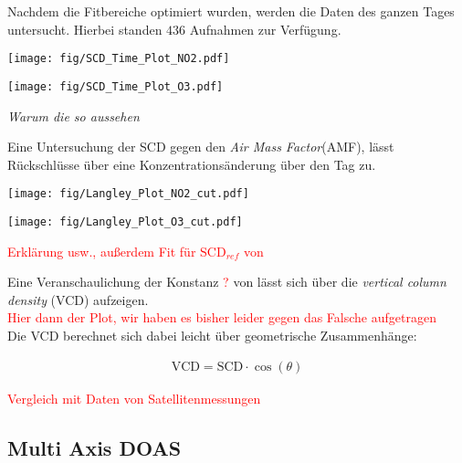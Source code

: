 \documentclass[12pt, a4paper, bibliography=totoc]{scrartcl}
\begin{document}
\begin{multicols}{2}
Nachdem die Fitbereiche optimiert wurden, werden die Daten des ganzen Tages untersucht. 
Hierbei standen $436$ Aufnahmen zur Verfügung.

\begin{center}
	\texttt{[image: fig/SCD\_Time\_Plot\_NO2.pdf]}
	\label{fig:delta_SCD_time_NO2}
\end{center}
       
\begin{center}
	\texttt{[image: fig/SCD\_Time\_Plot\_O3.pdf]}
	\label{fig:Delta_SCD_time_O3}
\end{center}       

\textit{Warum die so aussehen}

Eine Untersuchung der SCD gegen den \textit{Air Mass Factor}(AMF), lässt Rückschlüsse über eine Konzentrationsänderung über den Tag zu.

\begin{center}
	\texttt{[image: fig/Langley\_Plot\_NO2\_cut.pdf]}
	\label{fig:langley_NO2}
\end{center}

\begin{center}
	\texttt{[image: fig/Langley\_Plot\_O3\_cut.pdf]}
	\label{fig:langley_O3}
\end{center}

\textcolor{red}{Erklärung usw., außerdem Fit für $\text{SCD}_{ref}$ von }

Eine Veranschaulichung der Konstanz \textcolor{red}{?} von   lässt sich über die \textit{vertical column density} (VCD) aufzeigen.
\\
\textcolor{red}{Hier dann der Plot, wir haben es bisher leider gegen das Falsche aufgetragen}
\\
Die VCD berechnet sich dabei leicht über geometrische Zusammenhänge: 

\begin{align}
    \text{VCD} = \text{SCD} \cdot \cos(\theta)
\end{align}

\textcolor{red}{Vergleich mit Daten von Satellitenmessungen}

\subsection{Multi Axis DOAS}\label{ssec:multi_axis_DOAS}


\end{multicols}
\end{document}
